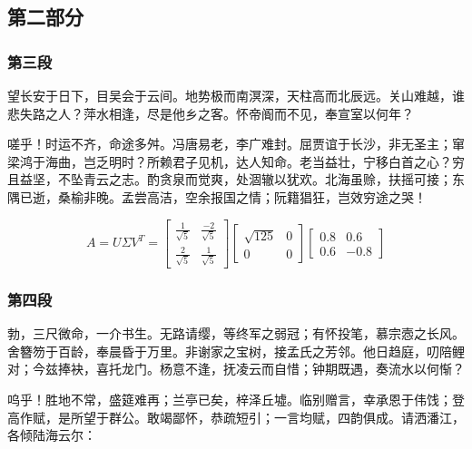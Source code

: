 \subsection{第二部分}
\subsubsection{第三段}
望长安于日下，目吴会于云间。地势极而南溟深，天柱高而北辰远。关山难越，谁悲失路之人？萍水相逢，尽是他乡之客。怀帝阍而不见，奉宣室以何年？

嗟乎！时运不齐，命途多舛。冯唐易老，李广难封。屈贾谊于长沙，非无圣主；窜梁鸿于海曲，岂乏明时？所赖君子见机，达人知命。老当益壮，宁移白首之心？穷且益坚，不坠青云之志。酌贪泉而觉爽，处涸辙以犹欢。北海虽赊，扶摇可接；东隅已逝，桑榆非晚。孟尝高洁，空余报国之情；阮籍猖狂，岂效穷途之哭！

\begin{equation}
    \label{equ:test}
    A=U\Sigma V^T=\begin{bmatrix}\frac{1}{\sqrt{5}}&\frac{-2}{\sqrt{5}}\\\frac{2}{\sqrt{5}}&\frac{1}{\sqrt{5}}\end{bmatrix}\begin{bmatrix}\sqrt{125}&0\\0&0\end{bmatrix}\begin{bmatrix}0.8&0.6\\0.6&-0.8\end{bmatrix}
\end{equation}

\subsubsection{第四段}
勃，三尺微命，一介书生\cite{book:test}。无路请缨，等终军之弱冠\cite{mt:test}；有怀投笔，慕宗悫之长风。舍簪笏于百龄，奉晨昏于万里。非谢家之宝树，接孟氏之芳邻。他日趋庭，叨陪鲤对；今兹捧袂，喜托龙门。杨意不逢，抚凌云而自惜；钟期既遇，奏流水以何惭？

呜乎！胜地不常\cite{article:test}，盛筵难再；兰亭已矣，梓泽丘墟。临别赠言\cite{ol:test}，幸承恩于伟饯；登高作赋，是所望于群公。敢竭鄙怀，恭疏短引；一言均赋，四韵俱成。请洒潘江，各倾陆海云尔：
